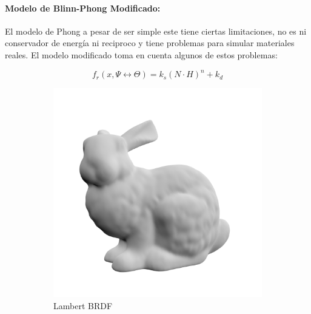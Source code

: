 \paragraph{Modelo de Blinn-Phong Modificado:}
\label{para:blinn_phong_mod}
El modelo de Phong a pesar de ser simple este tiene ciertas limitaciones, no es ni conservador de energía ni reciproco y tiene problemas para simular materiales reales. El modelo modificado toma en cuenta algunos de estos problemas:

\begin{equation}
    f_{r}(x, \Psi\leftrightarrow\Theta) = k_{s}(N\cdot H)^n + k_{d}
    \label{eq:blinn_phong}
\end{equation}

\begin{figure}[H]
	\centering
	\begin{subfigure}[t]{0.33\textwidth}
		\centering
		\captionsetup{justification=centering}
		\includegraphics[width=\linewidth]{media/diffuse_bunny.png}
		\caption*{Lambert \ac{BRDF}}
	\end{subfigure}%
	\begin{subfigure}[t]{0.33\textwidth}
		\centering
		\captionsetup{justification=centering}

\end{subfigure}
\end{figure}
